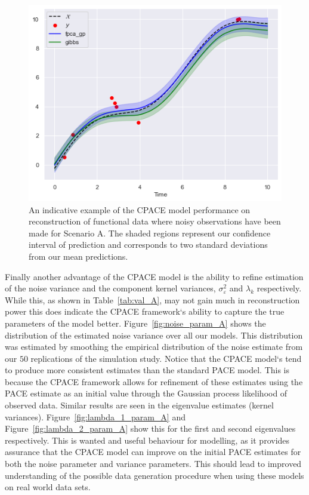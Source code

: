  \begin{figure}
 	\centering
 	\includegraphics[width=\textwidth]{ex_val_A}
 	\caption[An example reconstruction using the CPACE model for Scenario A in our simulation study.]{An indicative example of the CPACE model performance on reconstruction of functional data where noisy observations have been made for Scenario A. The shaded regions represent our confidence interval of prediction and corresponds to two standard deviations from our mean predictions.}
 	\label{fig:val_ex_A}
 \end{figure}

Finally another advantage of the CPACE model is the ability to refine estimation of the noise variance and the component kernel variances, $\sigma_\varepsilon^2$ and $\lambda_k$  respectively.
While this, as shown in Table~\ref{tab:val_A}, may not gain much in reconstruction power this does indicate the CPACE framework`s ability to capture the true parameters of the model better. 
Figure~\ref{fig:noise_param_A} shows the distribution of the estimated noise variance over all our models. 
This distribution was estimated by smoothing the empirical distribution of the noise estimate from our $50$ replications of the simulation study.
Notice that the CPACE model`s tend to produce more consistent estimates than the standard PACE model.
This is because the CPACE framework allows for refinement of these estimates using the PACE estimate as an initial value through the Gaussian process likelihood of observed data.
Similar results are seen in the eigenvalue estimates (kernel variances).
Figure~\ref{fig:lambda_1_param_A} and Figure~\ref{fig:lambda_2_param_A} show this for the first and second eigenvalues respectively.
This is wanted and useful behaviour for modelling, as it provides assurance that the CPACE model can improve on the initial PACE estimates for both the noise parameter and variance parameters.
This should lead to improved understanding of the possible data generation procedure when using these models on real world data sets.

